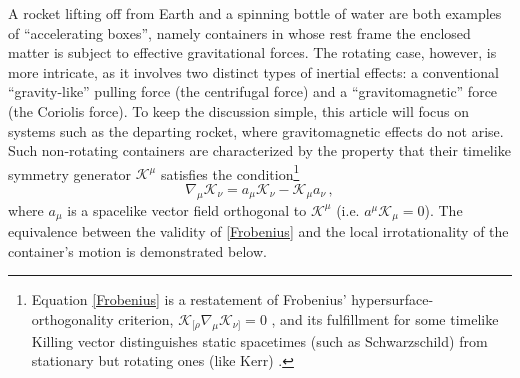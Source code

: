 \documentclass[a4paper, amsfonts, amssymb, amsmath, reprint, showkeys, nofootinbib, twoside, onecolumn,notitlepage]{revtex4-1}
\newcommand{\K}{{\mathcal{K}}}
\theoremstyle{definition}
\theoremstyle{theorem}
\begin{document}
A rocket lifting off from Earth and a spinning bottle of water are both examples of ``accelerating boxes'', namely containers in whose rest frame the enclosed matter is subject to effective gravitational forces. The rotating case, however, is more intricate, as it involves two distinct types of inertial effects: a conventional ``gravity-like'' pulling force (the centrifugal force) and a ``gravitomagnetic'' force (the Coriolis force). To keep the discussion simple, this article will focus on systems such as the departing rocket, where gravitomagnetic effects do not arise. Such non-rotating containers are characterized by the property that their timelike symmetry generator $\K^\mu$ satisfies the condition\footnote{Equation \eqref{Frobenius} is a restatement of Frobenius' hypersurface-orthogonality criterion, $\K_{[\rho} \nabla_{\mu} \K_{\nu]} = 0$ \cite[\S B.3]{Wald}, and its fulfillment for some timelike Killing vector distinguishes static spacetimes (such as Schwarzschild) from stationary but rotating ones (like Kerr) \cite[\S 6.1]{Wald}.}
\begin{equation}\label{Frobenius}
\nabla_{\mu}\K_{\nu}=a_\mu \K_\nu -\K_\mu a_\nu \, , 
\end{equation}
where $a_\mu$ is a spacelike vector field orthogonal to $\K^\mu$ (i.e. $a^\mu \K_\mu = 0$). The equivalence between the validity of \eqref{Frobenius} and the local irrotationality of the container's motion is demonstrated below.
\end{document}
